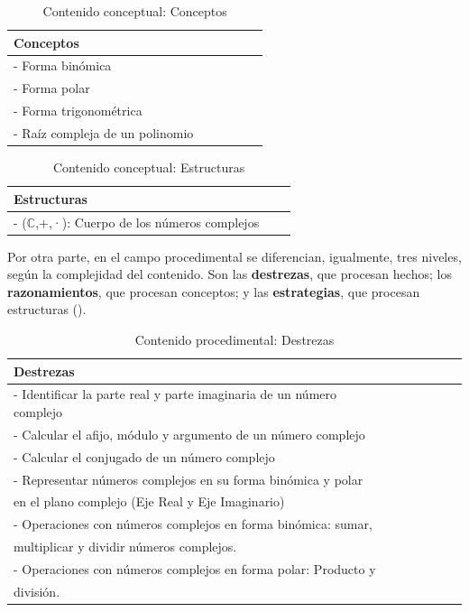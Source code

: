 \documentclass[../main.tex]{memoir}
\begin{document}
\begin{table}[H]
	\centering
	\begin{tabular}{lccccc}
		\toprule
		\hspace{2cm}Conceptos \\
		\midrule
		- Forma binómica \\
		- Forma polar \\
		- Forma trigonométrica\\
		- Raíz compleja de un polinomio \\
		\bottomrule
	\end{tabular}
	\caption{Contenido conceptual: Conceptos}
	\label{tab:conceptos2}
\end{table}

\begin{table}[H]
	\centering
	\begin{tabular}{lcc}
		\toprule
		\hspace{2.5cm}Estructuras \\
		\midrule
		 - ($\mathbb{C}$,+,·): Cuerpo de los números complejos \\
		\bottomrule
	\end{tabular}
	\caption{Contenido conceptual: Estructuras}
	\label{tab:estructuras}
\end{table}



Por otra parte, en el campo procedimental se diferencian, igualmente, tres niveles, según la complejidad del contenido. Son las \textbf{destrezas}, que procesan hechos; los \textbf{razonamientos}, que procesan conceptos; y las \textbf{estrategias}, que procesan estructuras (\cite{rico2016}). \\

\begin{table}[H]
	\centering
	\begin{tabular}{lcccccc}
		\toprule
		\hspace{5cm}Destrezas \\
		\midrule
		- Identificar la parte real y parte imaginaria de un número complejo \\
		- Calcular el afijo, módulo y argumento de un número complejo \\
		- Calcular el conjugado de un número complejo \\
		- Representar números complejos en su forma binómica y polar\\
		\hspace{0.2cm} en el plano complejo (Eje Real y Eje Imaginario) \\
		- Operaciones con números complejos en forma binómica: sumar, \\ \hspace{0.2cm}multiplicar y dividir números complejos. \\
		- Operaciones con números complejos en forma polar: Producto y \\
		\hspace{0.2cm}división. \\
		\bottomrule
	\end{tabular}
	\caption{Contenido procedimental: Destrezas}
	\label{tab:destrezas}
\end{table}
\end{document}
